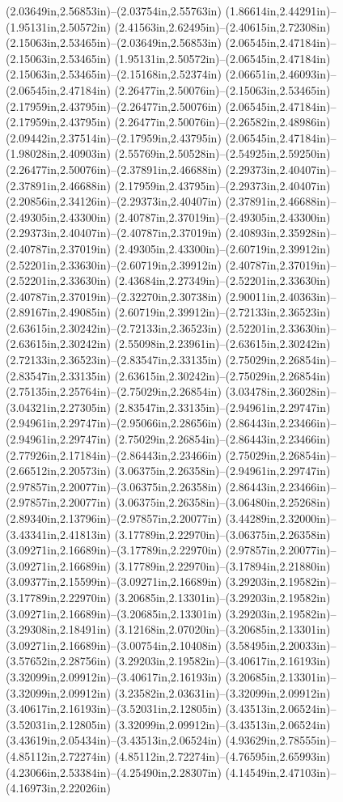 (2.03649in,2.56853in)--(2.03754in,2.55763in) (1.86614in,2.44291in)--(1.95131in,2.50572in) (2.41563in,2.62495in)--(2.40615in,2.72308in) (2.15063in,2.53465in)--(2.03649in,2.56853in) (2.06545in,2.47184in)--(2.15063in,2.53465in) (1.95131in,2.50572in)--(2.06545in,2.47184in) (2.15063in,2.53465in)--(2.15168in,2.52374in) (2.06651in,2.46093in)--(2.06545in,2.47184in) (2.26477in,2.50076in)--(2.15063in,2.53465in) (2.17959in,2.43795in)--(2.26477in,2.50076in) (2.06545in,2.47184in)--(2.17959in,2.43795in) (2.26477in,2.50076in)--(2.26582in,2.48986in) (2.09442in,2.37514in)--(2.17959in,2.43795in) (2.06545in,2.47184in)--(1.98028in,2.40903in) (2.55769in,2.50528in)--(2.54925in,2.59250in) (2.26477in,2.50076in)--(2.37891in,2.46688in) (2.29373in,2.40407in)--(2.37891in,2.46688in) (2.17959in,2.43795in)--(2.29373in,2.40407in) (2.20856in,2.34126in)--(2.29373in,2.40407in) (2.37891in,2.46688in)--(2.49305in,2.43300in) (2.40787in,2.37019in)--(2.49305in,2.43300in) (2.29373in,2.40407in)--(2.40787in,2.37019in) (2.40893in,2.35928in)--(2.40787in,2.37019in) (2.49305in,2.43300in)--(2.60719in,2.39912in) (2.52201in,2.33630in)--(2.60719in,2.39912in) (2.40787in,2.37019in)--(2.52201in,2.33630in) (2.43684in,2.27349in)--(2.52201in,2.33630in) (2.40787in,2.37019in)--(2.32270in,2.30738in) (2.90011in,2.40363in)--(2.89167in,2.49085in) (2.60719in,2.39912in)--(2.72133in,2.36523in) (2.63615in,2.30242in)--(2.72133in,2.36523in) (2.52201in,2.33630in)--(2.63615in,2.30242in) (2.55098in,2.23961in)--(2.63615in,2.30242in) (2.72133in,2.36523in)--(2.83547in,2.33135in) (2.75029in,2.26854in)--(2.83547in,2.33135in) (2.63615in,2.30242in)--(2.75029in,2.26854in) (2.75135in,2.25764in)--(2.75029in,2.26854in) (3.03478in,2.36028in)--(3.04321in,2.27305in) (2.83547in,2.33135in)--(2.94961in,2.29747in) (2.94961in,2.29747in)--(2.95066in,2.28656in) (2.86443in,2.23466in)--(2.94961in,2.29747in) (2.75029in,2.26854in)--(2.86443in,2.23466in) (2.77926in,2.17184in)--(2.86443in,2.23466in) (2.75029in,2.26854in)--(2.66512in,2.20573in) (3.06375in,2.26358in)--(2.94961in,2.29747in) (2.97857in,2.20077in)--(3.06375in,2.26358in) (2.86443in,2.23466in)--(2.97857in,2.20077in) (3.06375in,2.26358in)--(3.06480in,2.25268in) (2.89340in,2.13796in)--(2.97857in,2.20077in) (3.44289in,2.32000in)--(3.43341in,2.41813in) (3.17789in,2.22970in)--(3.06375in,2.26358in) (3.09271in,2.16689in)--(3.17789in,2.22970in) (2.97857in,2.20077in)--(3.09271in,2.16689in) (3.17789in,2.22970in)--(3.17894in,2.21880in) (3.09377in,2.15599in)--(3.09271in,2.16689in) (3.29203in,2.19582in)--(3.17789in,2.22970in) (3.20685in,2.13301in)--(3.29203in,2.19582in) (3.09271in,2.16689in)--(3.20685in,2.13301in) (3.29203in,2.19582in)--(3.29308in,2.18491in) (3.12168in,2.07020in)--(3.20685in,2.13301in) (3.09271in,2.16689in)--(3.00754in,2.10408in) (3.58495in,2.20033in)--(3.57652in,2.28756in) (3.29203in,2.19582in)--(3.40617in,2.16193in) (3.32099in,2.09912in)--(3.40617in,2.16193in) (3.20685in,2.13301in)--(3.32099in,2.09912in) (3.23582in,2.03631in)--(3.32099in,2.09912in) (3.40617in,2.16193in)--(3.52031in,2.12805in) (3.43513in,2.06524in)--(3.52031in,2.12805in) (3.32099in,2.09912in)--(3.43513in,2.06524in) (3.43619in,2.05434in)--(3.43513in,2.06524in) (4.93629in,2.78555in)--(4.85112in,2.72274in) (4.85112in,2.72274in)--(4.76595in,2.65993in) (4.23066in,2.53384in)--(4.25490in,2.28307in) (4.14549in,2.47103in)--(4.16973in,2.22026in) 